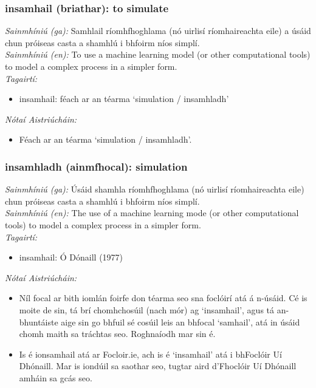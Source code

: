 \documentclass{article}
\begin{document}
\subsubsection*{insamhail (briathar): to simulate}
 \noindent \textit{Sainmhíniú (ga):} Samhlail ríomhfhoghlama (nó uirlisí ríomhaireachta eile) a úsáid chun próiseas casta a shamhlú i bhfoirm níos simplí.
\\
 \noindent \textit{Sainmhíniú (en):} To use a machine learning model (or other computational tools) to model a complex process in a simpler form.
\\
 \noindent \textit{Tagairtí:}
\begin{itemize}
	\item insamhail: féach ar an téarma `simulation / insamhladh'
\end{itemize}

 \noindent \textit{Nótaí Aistriúcháin:}
\begin{itemize}
	\item Féach ar an téarma `simulation / insamhladh'.
\end{itemize}


\subsubsection*{insamhladh (ainmfhocal): simulation}
 \noindent \textit{Sainmhíniú (ga):} Úsáid shamhla ríomhfhoghlama (nó uirlisí ríomhaireachta eile) chun próiseas casta a shamhlú i bhfoirm níos simplí.
\\
 \noindent \textit{Sainmhíniú (en):} The use of a machine learning mode (or other computational tools) to model a complex process in a simpler form.
\\
 \noindent \textit{Tagairtí:}
\begin{itemize}
	\item insamhail: Ó Dónaill (1977) \cite{odonaill}
\end{itemize}

 \noindent \textit{Nótaí Aistriúcháin:}
\begin{itemize}
	\item Níl focal ar bith iomlán foirfe don téarma seo sna foclóirí atá á n-úsáid. Cé is moite de sin, tá brí chomhchosúil (nach mór) ag `insamhail', agus tá an-bhuntáiste aige sin go bhfuil sé cosúil leis an bhfocal `samhail', atá in úsáid chomh maith sa tráchtas seo. Roghnaíodh mar sin é.
	\item Is é ionsamhail atá ar Focloir.ie, ach is é `insamhail' atá i bhFoclóir Uí Dhónaill. Mar is iondúil sa saothar seo, tugtar aird d'Fhoclóir Uí Dhónaill amháin sa gcás seo.
\end{itemize}
\end{document}
